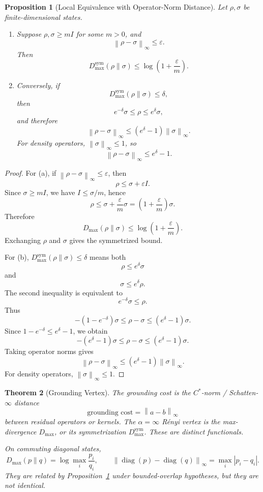 \documentclass[12pt]{article}
\newtheorem{theorem}{Theorem}[section]
\newtheorem{proposition}[theorem]{Proposition}
\theoremstyle{definition}
\newcommand{\norm}[1]{\left\lVert#1\right\rVert}
\newcommand{\Dmax}{D_{\max}}
\newcommand{\Dmaxsym}{D_{\max}^{\mathrm{sym}}}
\begin{document}
\begin{proposition}[Local Equivalence with Operator-Norm Distance]
\label{prop:grounding-local-equivalence}
Let $\rho,\sigma$ be finite-dimensional states.
\begin{enumerate}[label=(\alph*)]
\item Suppose $\rho,\sigma\ge mI$ for some $m>0$, and
\[
\norm{\rho-\sigma}_\infty\le\varepsilon.
\]
Then
\[
\Dmaxsym(\rho\|\sigma)
\le
\log\left(1+\frac{\varepsilon}{m}\right).
\]
\item Conversely, if
\[
\Dmaxsym(\rho\|\sigma)\le\delta,
\]
then
\[
e^{-\delta}\sigma
\le
\rho
\le
e^\delta\sigma,
\]
and therefore
\[
\norm{\rho-\sigma}_\infty
\le
(e^\delta-1)
\norm{\sigma}_\infty.
\]
For density operators, $\norm{\sigma}_\infty\le1$, so
\[
\norm{\rho-\sigma}_\infty
\le
e^\delta-1.
\]
\end{enumerate}
\end{proposition}

\begin{proof}
For (a), if $\norm{\rho-\sigma}_\infty\le\varepsilon$, then
\[
\rho\le\sigma+\varepsilon I.
\]
Since $\sigma\ge mI$, we have $I\le\sigma/m$, hence
\[
\rho
\le
\sigma+\frac{\varepsilon}{m}\sigma
=
\left(1+\frac{\varepsilon}{m}\right)\sigma.
\]
Therefore
\[
\Dmax(\rho\|\sigma)
\le
\log\left(1+\frac{\varepsilon}{m}\right).
\]
Exchanging $\rho$ and $\sigma$ gives the symmetrized bound.

For (b), $\Dmaxsym(\rho\|\sigma)\le\delta$ means both
\[
\rho\le e^\delta\sigma
\]
and
\[
\sigma\le e^\delta\rho.
\]
The second inequality is equivalent to
\[
e^{-\delta}\sigma\le\rho.
\]
Thus
\[
-(1-e^{-\delta})\sigma
\le
\rho-\sigma
\le
(e^\delta-1)\sigma.
\]
Since $1-e^{-\delta}\le e^\delta-1$, we obtain
\[
-(e^\delta-1)\sigma
\le
\rho-\sigma
\le
(e^\delta-1)\sigma.
\]
Taking operator norms gives
\[
\norm{\rho-\sigma}_\infty
\le
(e^\delta-1)
\norm{\sigma}_\infty.
\]
For density operators, $\norm{\sigma}_\infty\le1$.
\end{proof}

\begin{theorem}[Grounding Vertex]
\label{thm:grounding-vertex}
The grounding cost is the $C^*$-norm / Schatten-$\infty$ distance
\[
\text{grounding cost}
=
\norm{a-b}_\infty
\]
between residual operators or kernels.  The $\alpha=\infty$ R\'enyi vertex is
the max-divergence $\Dmax$, or its symmetrization $\Dmaxsym$.  These are
distinct functionals.

On commuting diagonal states,
\[
\Dmax(p\|q)
=
\log\max_i\frac{p_i}{q_i},
\qquad
\norm{\operatorname{diag}(p)-\operatorname{diag}(q)}_\infty
=
\max_i|p_i-q_i|.
\]
They are related by Proposition~\ref{prop:grounding-local-equivalence} under
bounded-overlap hypotheses, but they are not identical.
\end{theorem}
\end{document}
